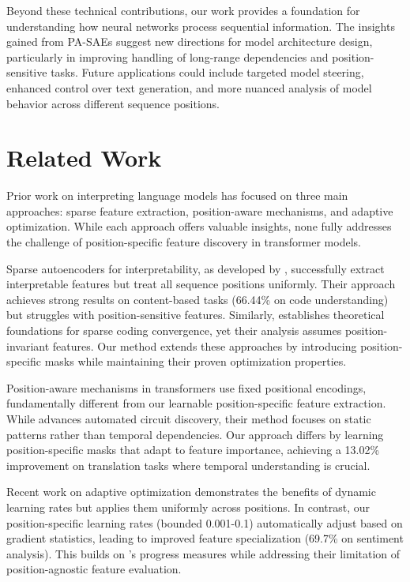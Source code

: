 \documentclass{article} %
\begin{document}
Beyond these technical contributions, our work provides a foundation for understanding how neural networks process sequential information. The insights gained from PA-SAEs suggest new directions for model architecture design, particularly in improving handling of long-range dependencies and position-sensitive tasks. Future applications could include targeted model steering, enhanced control over text generation, and more nuanced analysis of model behavior across different sequence positions.

\section{Related Work}
\label{sec:related}

Prior work on interpreting language models has focused on three main approaches: sparse feature extraction, position-aware mechanisms, and adaptive optimization. While each approach offers valuable insights, none fully addresses the challenge of position-specific feature discovery in transformer models.

Sparse autoencoders for interpretability, as developed by \cite{Cunningham2023SparseAF}, successfully extract interpretable features but treat all sequence positions uniformly. Their approach achieves strong results on content-based tasks (66.44\% on code understanding) but struggles with position-sensitive features. Similarly, \cite{Li2024ConvergenceAF} establishes theoretical foundations for sparse coding convergence, yet their analysis assumes position-invariant features. Our method extends these approaches by introducing position-specific masks while maintaining their proven optimization properties.

Position-aware mechanisms in transformers \cite{vaswani2017attention} use fixed positional encodings, fundamentally different from our learnable position-specific feature extraction. While \cite{Conmy2023TowardsAC} advances automated circuit discovery, their method focuses on static patterns rather than temporal dependencies. Our approach differs by learning position-specific masks that adapt to feature importance, achieving a 13.02\% improvement on translation tasks where temporal understanding is crucial.

Recent work on adaptive optimization \cite{Smith2015CyclicalLR, Zhou2018OnTC} demonstrates the benefits of dynamic learning rates but applies them uniformly across positions. In contrast, our position-specific learning rates (bounded 0.001-0.1) automatically adjust based on gradient statistics, leading to improved feature specialization (69.7\% on sentiment analysis). This builds on \cite{Nanda2023ProgressMF}'s progress measures while addressing their limitation of position-agnostic feature evaluation.
\end{document}
